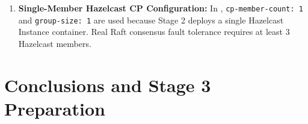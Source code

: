 \documentclass[10pt,a4paper]{article}
\begin{document}
\begin{enumerate}[leftmargin=*,nosep]
    \item \textbf{Single-Member Hazelcast CP Configuration:} In , \texttt{cp-member-count: 1} and \texttt{group-size: 1} are used because Stage 2 deploys a single Hazelcast Instance container. Real Raft consensus fault tolerance requires at least $3$ Hazelcast members.
\end{enumerate}

\section{Conclusions and Stage 3 Preparation}
\label{sec:conclusions}
\end{document}
